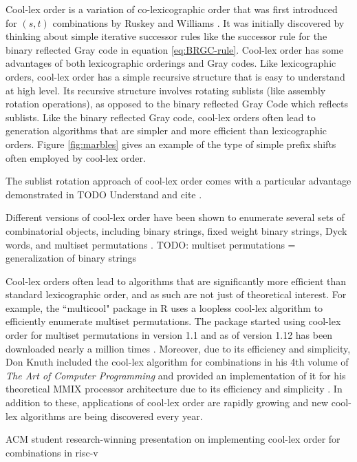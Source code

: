 Cool-lex order is a variation of co-lexicographic order that was first introduced for $(s,t)$ combinations by Ruskey and Williams \cite{ruskey2005generating} \cite{ruskey2008generating}.  It was initially discovered by thinking about simple iterative successor rules like the successor rule for the binary reflected Gray code in equation \ref{eq:BRGC-rule}. Cool-lex order has some advantages of both lexicographic orderings and Gray codes.  Like lexicographic orders, cool-lex order has a simple recursive structure that is easy to understand at  high level.  Its recursive structure involves rotating sublists (like assembly rotation operations), as opposed to the binary reflected Gray Code which reflects sublists.  Like the binary reflected Gray code, cool-lex orders often lead to generation algorithms that are simpler and more efficient than lexicographic orders.   Figure \ref{fig:marbles} gives an example of the type of simple prefix shifts often employed by cool-lex order.


The sublist rotation approach of cool-lex order comes with a particular advantage demonstrated in TODO Understand and cite \cite{ruskey2012binary}. 


Different versions of cool-lex order have been shown to enumerate several sets of combinatorial objects, including binary strings, fixed weight binary strings, Dyck words, and multiset permutations \cite{williams2009shift}.  
TODO: multiset permutations = generalization of binary strings


Cool-lex orders often lead to algorithms that are significantly more efficient than standard lexicographic order, and as such are not just of theoretical interest.  For example, the ``multicool" package in R uses a loopless cool-lex algorithm to efficiently enumerate multiset permutations.   The package started using cool-lex order for multiset permutations in version 1.1 and as of version 1.12 has been downloaded nearly a million times \cite{multicool_2021}.  Moreover, due to its efficiency and simplicity, Don Knuth included the cool-lex algorithm for combinations in his 4th volume of \emph{The Art of Computer Programming} and provided an implementation of it for his theoretical MMIX processor architecture due to its efficiency and simplicity \cite{knuth2015art}.  In addition to these, applications of cool-lex order are rapidly growing and new cool-lex algorithms are being discovered every year.  

ACM student research-winning presentation on implementing cool-lex order for combinations in risc-v

